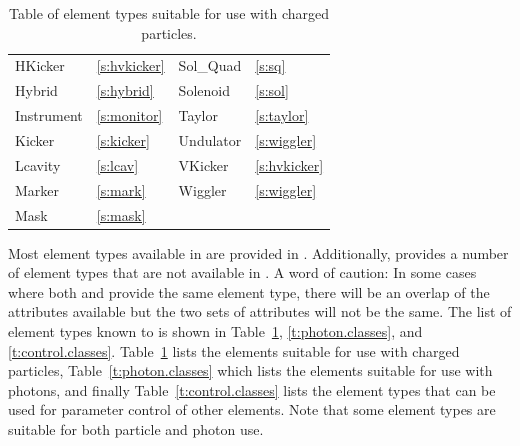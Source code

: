 \begin{table}[htb]
{\begin{tabular}{llll}
  HKicker           & \ref{s:hvkicker}    &  Sol_Quad          & \ref{s:sq}       \\
  Hybrid            & \ref{s:hybrid}      &  Solenoid          & \ref{s:sol}      \\
  Instrument        & \ref{s:monitor}     &  Taylor            & \ref{s:taylor}   \\
  Kicker            & \ref{s:kicker}      &  Undulator         & \ref{s:wiggler}  \\
  Lcavity           & \ref{s:lcav}        &  VKicker           & \ref{s:hvkicker} \\  
  Marker            & \ref{s:mark}        &  Wiggler           & \ref{s:wiggler}  \\
  Mask              & \ref{s:mask}        &                    &                  \\ \bottomrule
\end{tabular}
}
\caption{Table of element types suitable for use with charged particles.}
\label{t:particle.classes}\center
\end{table}

Most element types available in \mad are provided in \bmad.  Additionally, \bmad provides a number
of element types that are not available in \mad.  A word of caution: In some cases where both \mad
and \bmad provide the same element type, there will be an overlap of the attributes available but
the two sets of attributes will not be the same.  The list of element types known to \bmad is shown
in Table~\ref{t:particle.classes}, \ref{t:photon.classes}, and \ref{t:control.classes}.
Table~\ref{t:particle.classes} lists the elements suitable for use with charged particles,
Table~\ref{t:photon.classes} which lists the elements suitable for use with photons, and finally
Table~\ref{t:control.classes} lists the  element types that can be used for parameter
control of other elements. Note that some element types are suitable for both particle and photon
use.

